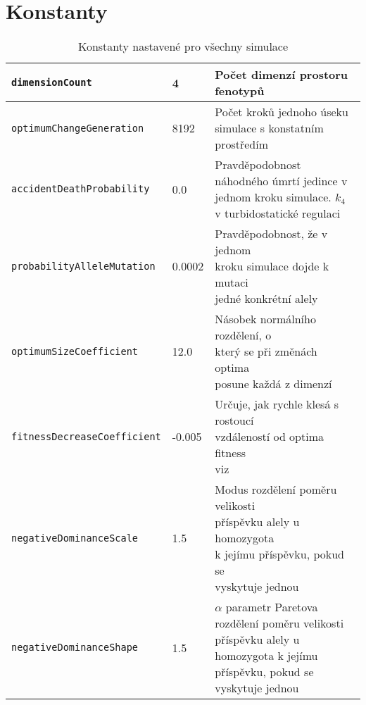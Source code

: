 \section{Konstanty}
\label{sec:constants}



\begin{table}[h]
\caption{Konstanty nastavené pro všechny simulace}

\centering
\label{constants}
\begin{tabularx}{\textwidth}{| l | l | l|}
\hline
\texttt{dimensionCount}             & 4      & Počet dimenzí prostoru fenotypů \\
\hline
\texttt{optimumChangeGeneration}    & 8192   & \makecell[l]{Počet kroků jednoho úseku\\simulace s konstatním prostředím}\\
\hline
\texttt{accidentDeathProbability}   & 0.0    & \makecell[l]{Pravděpodobnost náhodného úmrtí\\jedince v jednom kroku simulace.\\$k_4$ v turbidostatické regulaci} \\
\hline
\texttt{probabilityAlleleMutation}  & 0.0002 & \makecell[l]{Pravděpodobnost, že v jednom\\kroku simulace dojde k mutaci\\jedné konkrétní alely}\\
\hline
\texttt{optimumSizeCoefficient}     & 12.0   & \makecell[l]{Násobek normálního rozdělení, o\\který se při změnách optima\\posune každá z dimenzí}  \\
\hline
\texttt{fitnessDecreaseCoefficient} & -0.005 & \makecell[l]{Určuje, jak rychle klesá s rostoucí\\vzdáleností od optima fitness\\viz \citet{tenaillon2014utility}}\\
\hline
\texttt{negativeDominanceScale}     & 1.5    & \makecell[l]{Modus rozdělení poměru velikosti\\příspěvku alely u homozygota\\k jejímu příspěvku, pokud se\\vyskytuje jednou} \\
\hline
\texttt{negativeDominanceShape}     & 1.5    & \makecell[l]{$\alpha$ parametr Paretova rozdělení\\ poměru velikosti příspěvku alely\\ u homozygota k jejímu příspěvku,\\ pokud se vyskytuje jednou}\\
\hline
\end{tabularx}
\end{table}
